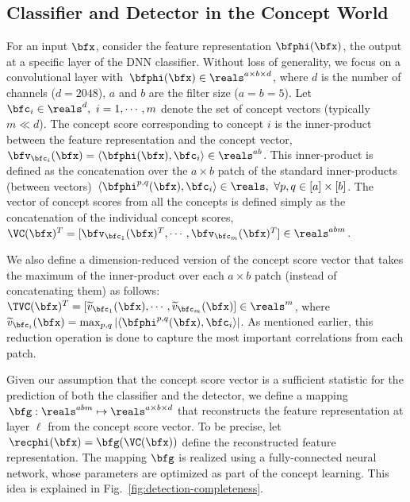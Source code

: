\subsection{Classifier and Detector in the Concept World}
For an input $\bfx$, consider the feature representation $\bfphi(\bfx)$, the output at a specific layer of the DNN classifier.
Without loss of generality, we focus on a convolutional layer with $\,\bfphi(\bfx) \in \reals^{a \times b \times d}$, where $d$ is the number of channels (\eg $d = 2048$), $a$ and $b$ are the filter size (\eg $a = b = 5$). Let $\bfc_i \in \reals^d, ~i = 1, \cdots, m$ denote the set of concept vectors (typically $m \ll d$).
The concept score corresponding to concept $i$ is the inner-product between the feature representation and the concept vector, \ie $\bfv_{\bfc_i}(\bfx) = \langle \bfphi(\bfx), \bfc_i \rangle \in \reals^{ab}$. This inner-product is defined as the concatenation over the $a \times b$ patch of the standard inner-products (between vectors) $\,\langle \bfphi^{p,q}(\bfx), \bfc_i \rangle \in \reals, ~\forall p, q \in [a] \times [b]$.
The vector of concept scores from all the concepts is defined simply as the concatenation of the individual concept scores, \ie $\VC(\bfx)^T = [\bfv_{\bfc_1}(\bfx)^T, \cdots, \bfv_{\bfc_m}(\bfx)^T] \in \reals^{abm}$.

We also define a dimension-reduced version of the concept score vector that takes the maximum of the inner-product over each $a \times b$ patch (instead of concatenating them) as follows: $\TVC(\bfx)^T = [\widetilde{v}_{\bfc_1}(\bfx), \cdots, \widetilde{v}_{\bfc_m}(\bfx)] \in \reals^m$, where $\widetilde{v}_{\bfc_i}(\bfx) = \max_{p, q} |\langle \bfphi^{p,q}(\bfx), \bfc_i \rangle|$. 
As mentioned earlier, this reduction operation is done to capture the most important correlations from each patch.

Given our assumption that the concept score vector is a sufficient statistic for the prediction of both the classifier and the detector, we define a mapping $\,\bfg : \reals^{abm} \mapsto \reals^{a \times b \times d}$ that reconstructs the feature representation at layer $\ell$ from the concept score vector.
To be precise, let $\,\recphi(\bfx) = \bfg(\VC(\bfx))$ define the reconstructed feature representation.
The mapping $\bfg$ is realized using a fully-connected neural network, whose parameters are optimized as part of the concept learning. This idea is explained in Fig.~\ref{fig:detection-completeness}.


